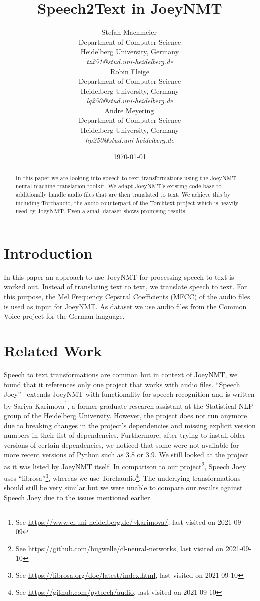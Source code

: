\documentclass[11pt,a4paper]{article}
\title{Speech2Text in JoeyNMT}
\author{\small Stefan Machmeier\,\orcidlink{0000-0002-7028-1755} \\
  \small Department of Computer Science \\
  \small Heidelberg University, Germany \\
  \small \textit{tz251@stud.uni-heidelberg.de} \\
  \And
  \small Robin Fleige \\
  \small Department of Computer Science \\
  \small Heidelberg University, Germany \\
  \small \textit{lq250@stud.uni-heidelberg.de} \\
  \And
  \small Andre Meyering\,\orcidlink{0000-0002-7973-0369} \\
  \small Department of Computer Science \\
  \small Heidelberg University, Germany \\
  \small \textit{hp250@stud.uni-heidelberg.de} \\}
\date{\today}
\begin{document}
\maketitle
\begin{abstract}
In this paper we are looking into speech to text transformations using the JoeyNMT neural machine translation toolkit.
We adapt JoeyNMT's existing code base to additionally handle audio files that are then translated to text.
We achieve this by including Torchaudio, the audio counterpart of the Torchtext project which is heavily used by JoeyNMT.
Even a small dataset shows promising results.
\end{abstract}

\section{Introduction}
In this paper an approach to use JoeyNMT for processing speech to text is worked out.
Instead of translating text to text, we translate speech to text.
For this purpose, the Mel Frequency Cepstral Coefficients (MFCC) of the audio files is used as input for JoeyNMT.
As dataset we use audio files from the Common Voice project for the German language.

\section{Related Work}

Speech to text transformations are common but in context of JoeyNMT, we found that it references only one project that works with audio files.
\enquote{Speech Joey}~\cite{speechjoey} extends JoeyNMT with functionality for speech recognition and is written by Sariya Karimova\footnote{See \url{https://www.cl.uni-heidelberg.de/~karimova/}, last visited on 2021-09-09}, a former graduate research assistant at the Statistical NLP group of the Heidelberg University.
However, the project does not run anymore due to breaking changes in the project's
dependencies and missing explicit version numbers in their list of dependencies.
Furthermore, after trying to install older versions of certain dependencies,
we noticed that some were not available for more recent versions of Python such as 3.8 or 3.9.
We still looked at the project as it was listed by JoeyNMT itself.
In comparison to our project\footnote{See \url{https://github.com/bugwelle/cl-neural-networks}, last visited on 2021-09-10}, Speech Joey uses \enquote{librosa}\footnote{See \url{https://librosa.org/doc/latest/index.html}, last visited on 2021-09-10}, whereas we use Torchaudio\footnote{See \url{https://github.com/pytorch/audio}, last visited on 2021-09-10}.
The underlying transformations should still be very similar but we were unable to compare our results against Speech Joey due to the issues mentioned earlier.
\end{document}
